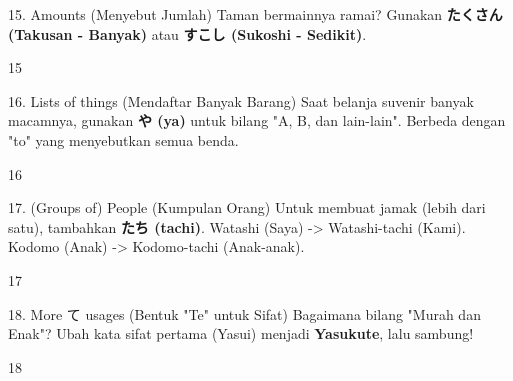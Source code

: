 \begin{lessonbox}{15. Amounts (Menyebut Jumlah)}
    Taman bermainnya ramai? Gunakan \textbf{たくさん (Takusan - Banyak)} atau \textbf{すこし (Sukoshi - Sedikit)}.
\end{lessonbox}
\begin{convobox}{15}
    \noindent
      

    \vspace{1.5em}
\end{convobox}

\begin{lessonbox}{16. Lists of things (Mendaftar Banyak Barang)}
    Saat belanja suvenir banyak macamnya, gunakan \textbf{や (ya)} untuk bilang "A, B, dan lain-lain". Berbeda dengan "to" yang menyebutkan semua benda.
\end{lessonbox}
\begin{convobox}{16}
    \noindent
      

    \vspace{1.5em}
\end{convobox}

\begin{lessonbox}{17. (Groups of) People (Kumpulan Orang)}
    Untuk membuat jamak (lebih dari satu), tambahkan \textbf{たち (tachi)}. Watashi (Saya) -> Watashi-tachi (Kami). Kodomo (Anak) -> Kodomo-tachi (Anak-anak).
\end{lessonbox}
\begin{convobox}{17}
    \noindent
     

    \vspace{1.5em}
\end{convobox}

\begin{lessonbox}{18. More て usages (Bentuk "Te" untuk Sifat)}
    Bagaimana bilang "Murah dan Enak"? Ubah kata sifat pertama (Yasui) menjadi \textbf{Yasukute}, lalu sambung!
\end{lessonbox}
\begin{convobox}{18}
    \noindent

    \vspace{1.5em}
\end{convobox}

